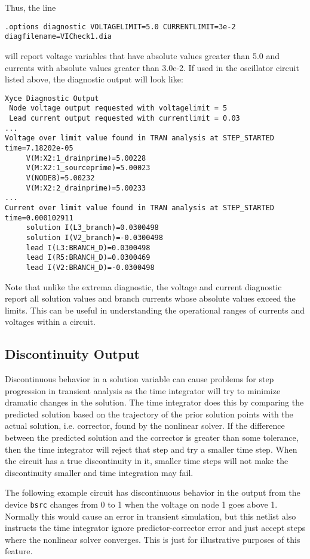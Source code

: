 Thus, the line
\begin{verbatim}
.options diagnostic VOLTAGELIMIT=5.0 CURRENTLIMIT=3e-2 diagfilename=VICheck1.dia
\end{verbatim}
will report voltage variables that have absolute values greater than 5.0 and currents
with absolute values greater than 3.0e-2.  If used in the oscillator circuit listed above, 
the diagnostic output will look like:

\begin{verbatim}
Xyce Diagnostic Output
 Node voltage output requested with voltagelimit = 5
 Lead current output requested with currentlimit = 0.03
...
Voltage over limit value found in TRAN analysis at STEP_STARTED time=7.18202e-05
     V(M:X2:1_drainprime)=5.00228
     V(M:X2:1_sourceprime)=5.00023
     V(NODE8)=5.00232
     V(M:X2:2_drainprime)=5.00233
...
Current over limit value found in TRAN analysis at STEP_STARTED time=0.000102911
     solution I(L3_branch)=0.0300498
     solution I(V2_branch)=-0.0300498
     lead I(L3:BRANCH_D)=0.0300498
     lead I(R5:BRANCH_D)=0.0300469
     lead I(V2:BRANCH_D)=-0.0300498
\end{verbatim}

Note that unlike the extrema diagnostic, the voltage and current diagnostic report all 
solution values and branch currents whose absolute values exceed the limits.  This can
be useful in understanding the operational ranges of currents and voltages within a circuit.

\subsection{Discontinuity Output}
Discontinuous behavior in a solution variable can cause problems for step progression 
in transient analysis as the time integrator will try to minimize dramatic changes 
in the solution.  The time integrator does this by comparing the predicted solution 
based on the trajectory of the prior solution points with the actual solution, i.e. corrector, 
found by the nonlinear solver.  If the difference between the predicted solution and the corrector 
is greater than some tolerance, then the time integrator
will reject that step and try a smaller time step.  When the circuit has a true 
discontinuity in it, smaller time steps will not make the discontinuity smaller and 
time integration may fail.

The following example circuit has discontinuous behavior in the output from 
the device \texttt{bsrc} changes from 0 to 1 when the voltage on node 1 goes 
above 1.  Normally this would cause an error in transient simulation, but this netlist
also instructs the time integrator ignore predictor-corrector error and just 
accept steps where the nonlinear solver converges.  This is just for illustrative 
purposes of this feature.  

